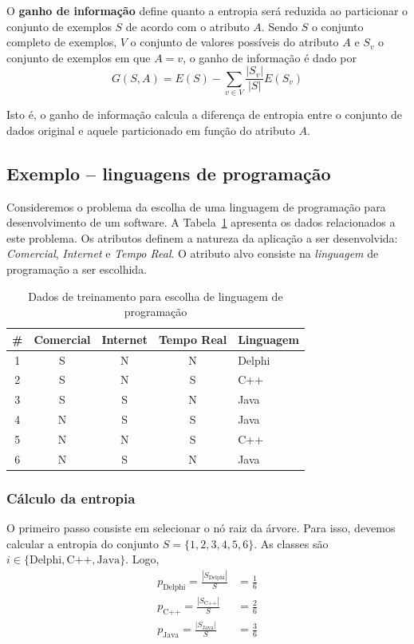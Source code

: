 O \textbf{ganho de informação} define quanto a entropia será reduzida ao particionar o conjunto de exemplos $S$ de acordo com o atributo $A$. Sendo $S$ o conjunto completo de exemplos, $V$ o conjunto de valores possíveis do atributo $A$ e $S_v$ o conjunto de exemplos em que $A = v$, o ganho de informação é dado por
$$
G(S, A) = E(S) - \sum_{v \in V} \frac{|S_v|}{|S|} E(S_v)
$$

Isto é, o ganho de informação calcula a diferença de entropia entre o conjunto de dados original e aquele particionado em função do atributo $A$.

\subsection{Exemplo -- linguagens de programação}

Consideremos o problema da escolha de uma linguagem de programação para desenvolvimento de um software. A Tabela~\ref{tab:dados-linguagens-programacao} apresenta os dados relacionados a este problema. Os atributos definem a natureza da aplicação a ser desenvolvida: \textit{Comercial}, \textit{Internet} e \textit{Tempo Real}. O atributo alvo consiste na \textit{linguagem} de programação a ser escolhida.

\begin{table}[h]
	\centering
	
	\begin{tabular}{ccccl}
		\hline
		\textbf{\#} & \textbf{Comercial} & \textbf{Internet} & \textbf{Tempo Real} & \textbf{Linguagem} \\
		\hline
		1 & S & N & N & Delphi \\
		2 & S & N & S & C++ \\
		3 & S & S & N & Java \\
		4 & N & S & S & Java \\
		5 & N & N & S & C++ \\
		6 & N & S & N & Java \\
		\hline
	\end{tabular}
	
	\caption{Dados de treinamento para escolha de linguagem de programação}
	\label{tab:dados-linguagens-programacao}
\end{table}

\subsubsection{Cálculo da entropia}

O primeiro passo consiste em selecionar o nó raiz da árvore. Para isso, devemos calcular a entropia do conjunto $S = \{1, 2, 3, 4, 5, 6\}$. As classes são $i \in \{\text{Delphi}, \text{C++}, \text{Java}\}$. Logo,
\begin{align*}
	p_{\text{Delphi}} = \frac{|S_{\text{Delphi}}|}{S} &= \frac{1}{6} \\[10pt]
	p_{\text{C++}} = \frac{|S_{\text{C++}}|}{S} &= \frac{2}{6} \\[10pt]
	p_{\text{Java}} = \frac{|S_{\text{Java}}|}{S} &= \frac{3}{6}
\end{align*}

